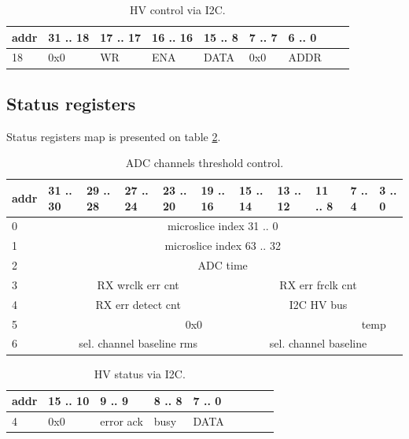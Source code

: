 \documentclass{article}
\begin{document}
\begin{table}[H]
\centering
\begin{tabular}{| l | l | l | l | l | l | l | l | l |}
\hline
addr & 31 .. 18 & 17 .. 17 & 16 .. 16 & 15 .. 8 & 7 .. 7 & 6 .. 0 \\ \hline
18 & 0x0 & WR & ENA & DATA & 0x0 & ADDR \\ \hline
\end{tabular}
\caption{HV control via I2C.\label{tab7}}
\end{table}


\subsection{Status registers}

Status registers map is presented on table \ref{tab8}. 

\begin{table}[H]
\centering
\begin{tabular}{| l | l | l | l | l | l | l | l | l | l | l |}
\hline
addr & 31 .. 30 & 29 .. 28 & 27 .. 24 & 23 .. 20 & 19 .. 16 & 15 .. 14 & 13 .. 12 & 11 .. 8 & 7 .. 4 & 3 .. 0 \\ \hline
0 & \multicolumn{10}{c|}{microslice index 31 .. 0}\\ \hline
1 & \multicolumn{10}{c|}{microslice index 63 .. 32}\\ \hline
2 & \multicolumn{10}{c|}{ADC time}\\ \hline
3 & \multicolumn{5}{c|}{RX wrclk err cnt} & \multicolumn{5}{c|}{RX err frclk cnt} \\ \hline
4 & \multicolumn{5}{c|}{RX err detect cnt} & \multicolumn{5}{c|}{I2C HV bus}\\ \hline
5 & \multicolumn{8}{c|}{0x0} & \multicolumn{2}{c|}{temp} \\ \hline
6 & \multicolumn{5}{c|}{sel. channel baseline rms} & \multicolumn{5}{c|}{sel. channel baseline}\\ \hline
\end{tabular}
\caption{ADC channels threshold control.\label{tab8}}
\end{table}

\begin{table}[H]
\centering
\begin{tabular}{| l | l | l | l | l | l | l | l | l |}
\hline
addr & 15 .. 10 & 9 .. 9 & 8 .. 8 & 7 .. 0 \\ \hline
4 & 0x0 & error ack & busy & DATA \\ \hline
\end{tabular}
\caption{HV status via I2C.\label{tab9}}
\end{table}
\end{document}
